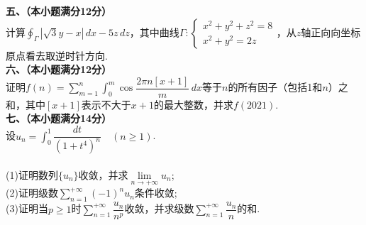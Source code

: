 \documentclass[UTF8]{ctexart}
\begin{document}
	\textbf{五、（本小题满分12分）}\\
	计算$\displaystyle\oint_{\mathit{\Gamma}}\left|\sqrt{3}y-x\right|\,dx-5z\,dz$，其中曲线$\mathit{\Gamma}:\begin{cases}x^{2}+y^{2}+z^{2}=8\\x^{2}+y^{2}=2z\end{cases}$，从$z$轴正向向坐标原点看去取逆时针方向.\\
	\textbf{六、（本小题满分12分）}\\
	证明$f(n)=\sum\limits_{m=1}^{n}\displaystyle\int_{0}^{m}\cos\dfrac{2\pi n[x+1]}{m}\,dx$等于$n$的所有因子（包括1和$n$）之和，其中$[x+1]$表示不大于$x+1$的最大整数，并求$f(2021)$.\\
	\newpage
	\textbf{七、（本小题满分14分）}\\
	设$u_{n}=\displaystyle\int_{0}^{1}\dfrac{dt}{(1+t^{4})^{n}}\quad(n\geq 1)$.\\\\
	 (1)证明数列$\{u_{n}\}$收敛，并求$\lim\limits_{n\rightarrow +\infty}u_{n}$;\\
	(2)证明级数$\sum\limits_{n=1}^{+\infty}(-1)^{n}u_{n}$条件收敛;\\
	(3)证明当$p\geq 1$时$\sum\limits_{n=1}^{+\infty}\dfrac{u_{n}}{n^{p}}$收敛，并求级数$\sum\limits_{n=1}^{+\infty}\dfrac{u_{n}}{n}$的和.\\
\end{document}
